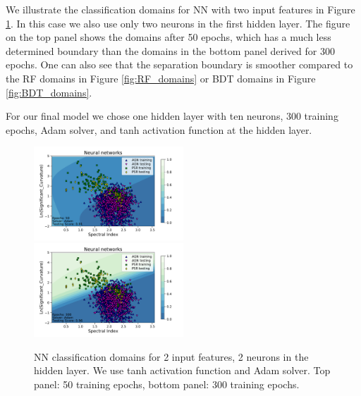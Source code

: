 We illustrate the classification domains for NN with two input features in Figure \ref{fig:NN_domains}. 
In this case we also use only two neurons in the first hidden layer.
The figure on the top panel shows the domains after 50 epochs, which has a much less determined boundary than the
domains in the bottom panel derived for 300 epochs. 
One can also see that the separation boundary is smoother compared to the RF domains in Figure \ref{fig:RF_domains} or BDT domains in Figure \ref{fig:BDT_domains}.

For our final model we chose one hidden layer with ten neurons, 300 training epochs, Adam solver, and tanh activation function at the hidden layer.


\begin{figure}[h]
\center
\includegraphics[width=0.5\textwidth]{plots/classification_domains/nn_adam_10_tanh_50_final.pdf}\\
\includegraphics[width=0.5\textwidth]{plots/classification_domains/nn_adam_10_tanh_300_final.pdf}
\caption{NN classification domains for 2 input features, 2 neurons in the hidden layer. 
We use tanh activation function and Adam solver. Top panel: 50 training epochs, bottom panel: 300 training epochs.}
\label{fig:NN_domains}
\end{figure}

